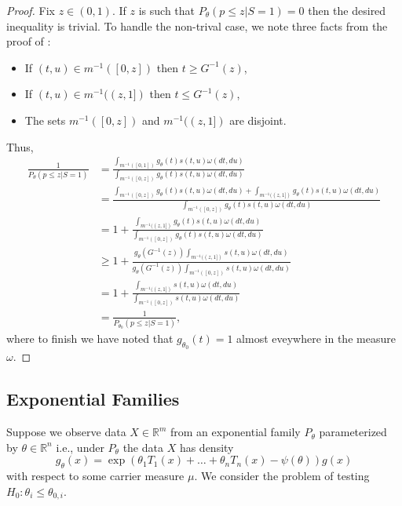 \documentclass{article}
\newcommand{\R}{\mathbb{R}}
\begin{document}
\begin{appendix}
\begin{proof}

Fix $z \in (0, 1)$. If $z$ is such that $P_{\theta}(p \leq z | S = 1)  = 0$ then the desired inequality is trivial. To handle the non-trival case, we note three facts from the proof of :
\begin{itemize}
    \item If $(t, u) \in m^{-1}([0, z])$ then $t \geq G^{-1}(z)$,
    \item If $(t, u) \in m^{-1}((z, 1])$ then $t \leq G^{-1}(z)$,
    \item The sets $m^{-1}([0, z])$ and $m^{-1}((z, 1])$ are disjoint.
\end{itemize}
Thus,
\begin{align*}
     \frac{1}{P_{\theta}(p \leq z | S = 1)} &= \frac{\int_{m^{-1}([0, 1])} g_{\theta}(t) s(t, u) \omega(dt, du) }{\int_{m^{-1}([0, z])} g_{\theta}(t) s(t, u) \omega(dt, du) }\\
                                            &= \frac{\int_{m^{-1}([0, z])} g_{\theta}(t) s(t, u) \omega(dt, du) + \int_{m^{-1}((z, 1])} g_{\theta}(t)  s(t, u)\omega(dt, du) }{\int_{m^{-1}([0, z])} g_{\theta}(t) s(t, u) \omega(dt, du) }\\
                                            &= 1 + \frac{\int_{m^{-1}((z, 1])} g_{\theta}(t) s(t, u) \omega(dt, du)}{\int_{m^{-1}([0, z])} g_{\theta}(t) s(t, u) \omega(dt, du)}\\
                                            &\geq 1 + \frac{g_{\theta}(G^{-1}(z))  \int_{m^{-1}((z, 1])}  s(t, u) \omega(dt, du)}{g_{\theta}(G^{-1}(z)) \int_{m^{-1}([0, z])} s(t, u) \omega(dt, du)} \\
                                            &= 1 + \frac{\int_{m^{-1}((z, 1])} s(t, u) \omega(dt, du)}{ \int_{m^{-1}([0, z])} s(t, u) \omega(dt, du)} \\
                                            &= \frac{1}{P_{\theta_0}(p \leq z | S = 1)}, 
\end{align*}
where to finish we have noted that $g_{\theta_0}(t) = 1$ almost eveywhere in the measure $\omega$. 
\end{proof}

\subsection{Exponential Families}

Suppose we observe data $X \in \R^m$ from an exponential family $P_{\theta}$ parameterized by $\theta \in \R^n$ i.e., under $P_{\theta}$ the data $X$ has density  
\begin{equation*}
    g_{\theta}(x) = \exp( \theta_1 T_1(x) + \dots + \theta_n T_n(x) - \psi(\theta) ) g(x) 
\end{equation*}
with respect to some carrier measure $\mu$. We consider the problem of testing $H_0: \theta_i \leq \theta_{0, i}$.


\end{appendix}
\end{document}
